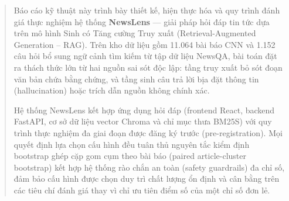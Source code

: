 \begin{abstract}
\setlength{\parskip}{1.5pt}
Báo cáo kỹ thuật này trình bày thiết kế, hiện thực hóa và quy trình đánh giá thực nghiệm hệ thống \textbf{NewsLens} --- giải pháp hỏi đáp tin tức dựa trên mô hình Sinh có Tăng cường Truy xuất (Retrieval-Augmented Generation -- RAG). Trên kho dữ liệu gồm 11.064 bài báo CNN và 1.152 câu hỏi bổ sung ngữ cảnh tìm kiếm từ tập dữ liệu NewsQA, bài toán đặt ra thách thức lớn từ hai nguồn sai sót độc lập: tầng truy xuất bỏ sót đoạn văn bản chứa bằng chứng, và tầng sinh câu trả lời bịa đặt thông tin (hallucination) hoặc trích dẫn nguồn không chính xác.

Hệ thống NewsLens kết hợp ứng dụng hỏi đáp (frontend React, backend FastAPI, cơ sở dữ liệu vector Chroma và chỉ mục thưa BM25S) với quy trình thực nghiệm đa giai đoạn được đăng ký trước (pre-registration). Mọi quyết định lựa chọn cấu hình đều tuân thủ nguyên tắc kiểm định bootstrap ghép cặp gom cụm theo bài báo (paired article-cluster bootstrap) kết hợp hệ thống rào chắn an toàn (safety guardrails) đa chỉ số, đảm bảo cấu hình được chọn duy trì chất lượng ổn định và cân bằng trên các tiêu chí đánh giá thay vì chỉ ưu tiên điểm số của một chỉ số đơn lẻ.


\end{abstract}
